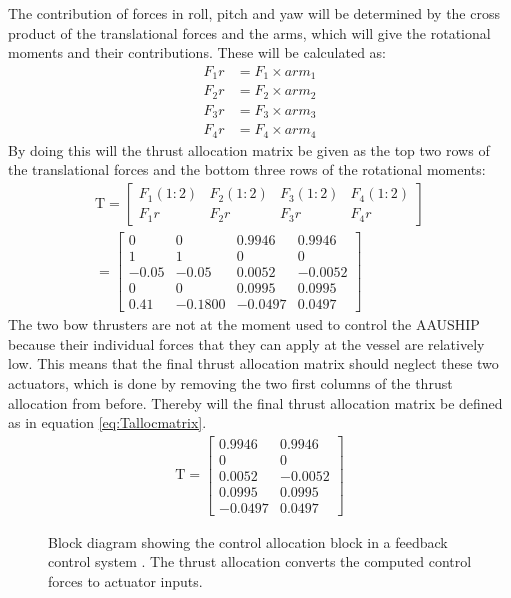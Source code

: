 The contribution of forces in roll, pitch and yaw will be determined by the cross product of the translational forces and the arms, which will give the rotational moments and their contributions. These will be calculated as:
\begin{align}
F_1r &= F_1\times arm_1\\
F_2r &= F_2\times arm_2\\
F_3r &= F_3\times arm_3\\
F_4r &= F_4\times arm_4
\end{align}
By doing this will the thrust allocation matrix be given as the top two rows of the translational forces and the bottom three rows of the rotational moments:
\begin{align}
\text{T} =
\begin{bmatrix}
F_1(1:2) & F_2(1:2) & F_3(1:2) & F_4(1:2) \\
F_1r & F_2r & F_3r & F_4r
\end{bmatrix}\\
=
\begin{bmatrix}
0 & 0 & 0.9946 & 0.9946 \\
1 & 1 & 0 & 0 \\
-0.05 & -0.05 & 0.0052 & -0.0052 \\
0 & 0 & 0.0995 & 0.0995 \\
0.41 & -0.1800 & -0.0497 & 0.0497
\end{bmatrix}
\end{align}
The two bow thrusters are not at the moment used to control the AAUSHIP because their individual forces that they can apply at the vessel are relatively low. This means that the final thrust allocation matrix should neglect these two actuators, which is done by removing the two first columns of the thrust allocation from before. Thereby will the final thrust allocation matrix be defined as in equation \ref{eq:Tallocmatrix}.
\begin{align}
\text{T} =
\begin{bmatrix}
0.9946 & 0.9946 \\
0 & 0 \\
0.0052 & -0.0052 \\
0.0995 & 0.0995 \\
-0.0497 & 0.0497
\end{bmatrix}
\label{eq:Tallocmatrix}
\end{align}

\begin{figure}[htbp]
\centering

\caption{Block diagram showing the control allocation block in a
feedback control system \citep[fig.12.25]{fossen}. The thrust
allocation converts the computed control forces to actuator inputs.}
\label{fig:thrust_allocation_block}
\end{figure}
